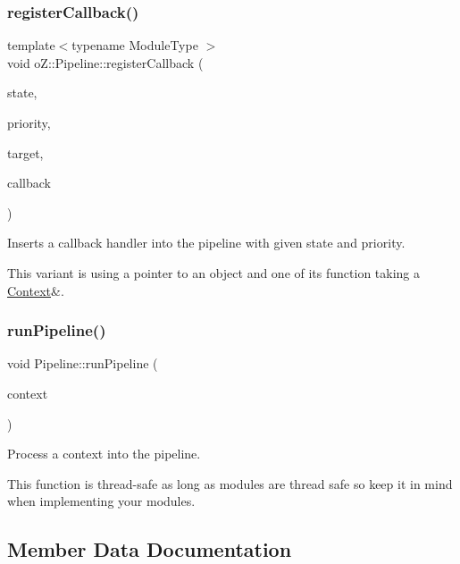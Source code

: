 \subsubsection{\texorpdfstring{registerCallback()}{registerCallback()}\hspace{0.1cm}{\footnotesize\ttfamily [2/2]}}
{\footnotesize\ttfamily template$<$typename Module\+Type $>$ \\
void o\+Z\+::\+Pipeline\+::register\+Callback (\begin{DoxyParamCaption}\item[{\mbox{\hyperlink{namespaceo_z_a356b278f7c65def0cae75fca8cae268e}{State}}}]{state,  }\item[{\mbox{\hyperlink{namespaceo_z_af05a92eb185d18369e9b4acdcd9dcd12}{Priority}}}]{priority,  }\item[{Module\+Type $\ast$}]{target,  }\item[{bool(Module\+Type\+::$\ast$)(\mbox{\hyperlink{classo_z_1_1_context}{Context}} \&)}]{callback }\end{DoxyParamCaption})}



Inserts a callback handler into the pipeline with given state and priority. 

This variant is using a pointer to an object and one of its function taking a \mbox{\hyperlink{classo_z_1_1_context}{Context}}\&. \mbox{\label{classo_z_1_1_pipeline_a90bddc5511acce66f2aa780c3bba29b4}} 
\subsubsection{\texorpdfstring{runPipeline()}{runPipeline()}}
{\footnotesize\ttfamily void Pipeline\+::run\+Pipeline (\begin{DoxyParamCaption}\item[{\mbox{\hyperlink{classo_z_1_1_context}{Context}} \&}]{context }\end{DoxyParamCaption})}



Process a context into the pipeline. 

This function is thread-\/safe as long as modules are thread safe so keep it in mind when implementing your modules. 

\subsection{Member Data Documentation}
\mbox{\label{classo_z_1_1_pipeline_a6412859211177d78f0eebcecda79e841}} 
